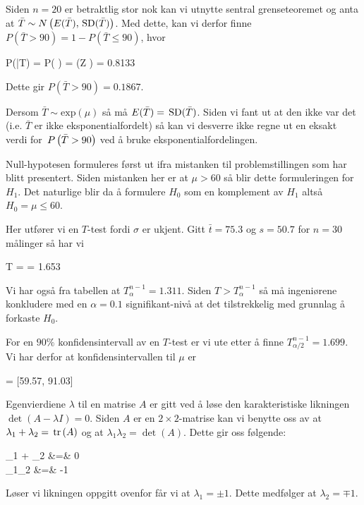 \deloppgave
Siden $n = 20$ er betraktlig stor nok kan vi utnytte sentral grenseteoremet og anta at $\bar{T}\sim N\left(E(\bar{T}), \,\mathrm{SD}(\bar{T})\right)$. Med dette, kan vi derfor finne $P(\bar{T} > 90) = 1 - P(\bar{T}\leq 90)$, hvor
\begin{likning}
	P(\bar{T}) = P\left( \leq {}\right) = \Phi\left(Z \right) = 0.8133 
\end{likning}
Dette gir $P\left(\bar{T} > 90\right) = 0.1867$.

\deloppgave
Dersom $\bar{T} \sim \mathrm{exp}(\mu)$ så må $E(\bar{T}) = \,\mathrm{SD}(\bar{T})$. Siden vi fant ut at den ikke var det (i.e. $\bar{T}$ er ikke eksponentialfordelt) så kan vi desverre ikke regne ut en eksakt verdi for $\,P\left(\bar{T} > 90\right)$ ved å bruke eksponentialfordelingen.

\deloppgave
Null-hypotesen formuleres først ut ifra mistanken til problemstillingen som har blitt presentert. Siden mistanken her er at $\mu > 60$ så blir dette formuleringen for $H_1$. Det naturlige blir da å formulere $H_0$ som en komplement av $H_1$ altså $H_0 = \mu \leq 60$.

\deloppgave
Her utfører vi en $T$-test fordi $\sigma$ er ukjent. Gitt $\bar{t} = 75.3$ og $s = 50.7$ for $n = 30$ målinger så har vi
\begin{likning}
	T =  = 1.653
\end{likning}
Vi har også fra tabellen at $T_\alpha^{n-1} = 1.311$. Siden $T > T_\alpha^{n-1}$ så må ingeniørene konkludere med en $\alpha = 0.1$ signifikant-nivå at det tilstrekkelig med grunnlag å forkaste $H_0$.

\deloppgave
For en $90\%$ konfidensintervall av en $T$-test er vi ute etter å finne $T_{\alpha/2}^{n-1} = 1.699$. Vi har derfor at konfidensintervallen til $\mu$ er
\begin{likning}
	 = [59.57, 91.03]
\end{likning}

\matte
\oppgave
\deloppgave
Egenvierdiene $\lambda$ til en matrise $A$ er gitt ved å løse den karakteristiske likningen $\det(A-\lambda I) = 0$. Siden $A$ er en $2\times 2$-matrise kan vi benytte oss av at $\lambda_1 + \lambda_2 = \,\mathrm{tr}\left(A\right)$ og at $\lambda_1\lambda_2 = \det(A)$. Dette gir oss følgende:
\begin{utregning}
	\lambda_1 + \lambda_2 &=& 0\\
	\lambda_1\lambda_2 &=& -1
\end{utregning}
Løser vi likningen oppgitt ovenfor får vi at $\lambda_1 = \pm 1$. Dette medfølger at $\lambda_2 = \mp 1$. 
\newline

